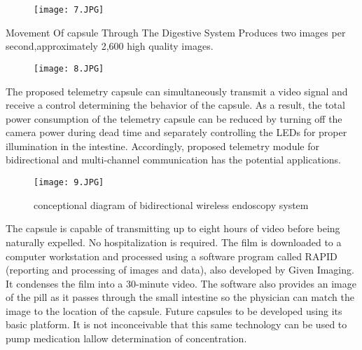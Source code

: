 \documentclass{article}
\begin{document}
\begin{figure}[h]
    \centering
    \texttt{[image: 7.JPG]}

\end{figure}
Movement Of capsule Through The Digestive System Produces two images per second,approximately 2,600 high quality images.

\begin{figure}[h]
    \centering
    \texttt{[image: 8.JPG]}

\end{figure}



The proposed telemetry capsule can simultaneously transmit a video signal and receive a control determining the behavior of the capsule. As a result, the total power consumption of the telemetry capsule can be reduced by turning off the camera power during dead time and separately controlling the LEDs for proper illumination in the intestine. Accordingly, proposed telemetry module for bidirectional and multi-channel communication has the potential applications.


\begin{figure}[h]
    \centering
    \texttt{[image: 9.JPG]}
\caption{conceptional diagram of bidirectional wireless endoscopy system}
\end{figure}

The capsule is capable of transmitting up to eight hours of video before being naturally expelled. No hospitalization is required. The film is downloaded to a computer workstation and processed using a software program called RAPID (reporting and processing of images and data), also developed by Given Imaging. It condenses the film into a 30-minute video. The software also provides an image of the pill as it passes through the small intestine so the physician can match the image to the location of the capsule. Future capsules to be developed using its basic platform. It is not inconceivable that this same technology can be used to pump medication lallow determination of concentration.
\end{document}
